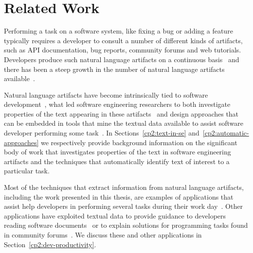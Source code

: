 \setcounter{chapter}{1}


\chapter{Related Work}
\label{ch:related-work}








Performing a task on a software system, like fixing a bug
or adding a feature typically requires a developer to consult
a number of different kinds of artifacts, such
as API documentation, bug reports, community forums
and web tutorials. 
Developers produce such natural language artifacts on a 
continuous basis~\cite{Rastkar2013t} 
and there has been a steep growth in the number 
of natural language artifacts available~\cite{Bavota2016, umarji2008archetypal}.


Natural language artifacts have become intrinsically tied to software development~\cite{liu2021},
what led 
 software engineering researchers to both
investigate 
properties of the text 
appearing in these artifacts~\cite{Maalej2013, Sorbo2015}
and design approaches that 
can be embedded in
tools that mine the textual data available to assist software developer performing some task~\cite{Holmes2008, Cubranic2005, Bavota2016}.
In Sections~\ref{cp2:text-in-se} and~\ref{cp2:automatic-approaches}
we respectively provide background information on the significant body 
of work that investigates properties of the text in software engineering 
artifacts and the techniques that automatically identify text of interest 
to a particular task.






Most of the techniques that extract information from natural 
language artifacts, including the work presented in this thesis, 
are examples of applications that assist help developers in performing 
several tasks during their work day~\cite{Meyer2017}. 
Other applications have exploited textual data
to provide guidance to developers reading software documents~\cite{Treude2016,  robillard2017} 
or  to  explain solutions for programming tasks found in community forums~\cite{silva2019}.
We discuss these and other applications in Section~\ref{cp2:dev-productivity}.








